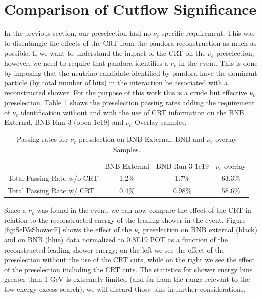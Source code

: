 \newpage
\section{Comparison of Cutflow Significance}\label{sec:Significance}
In the previous section, our preselection had no $\nu_e$ specific requirement. This was to disentangle the  effects of the CRT from the pandora reconstruction as much as possible. If we want to understand the impact of the CRT on the $\nu_e$ preselection, however, we need to require that pandora identifies a $\nu_e$ in the event.  This is done by imposing that the neutrino candidate identified by pandora have the dominant particle (by total number of hits) in the interaction be associated with a reconstructed shower. For the purpose of this work this is a crude but effective $\nu_e$ preselection.
Table \ref{tab:PSNue} shows the preselection passing rates adding the requirement of $\nu_e$ identification without and with the use of CRT information on the BNB External,  BNB Run 3 (open 1e19) and  $\nu_e$ Overlay samples. 


\begin{table}[h]
\begin{tabular}{ c || c | c || c | c || c | c || }
\cline{2-7}
                                            & \multicolumn{2}{c||}{BNB External} & \multicolumn{2}{c||}{BNB Run 3 1e19} & \multicolumn{2}{c||}{$\nu_e$ overlay} \\ \cline{1-7} 
\multicolumn{1}{|l||}{Total Passing Rate w/o CRT}    &         \multicolumn{2}{c||}{ 1.2\%}    &   \multicolumn{2}{c||}{1.7\%}  & \multicolumn{2}{c||}{63.3\%}\\ \hline
\multicolumn{1}{|l||}{Total Passing Rate w/ CRT}       &                 \multicolumn{2}{c||}{0.4\%}      & \multicolumn{2}{c||}{0.98\%}     &  \multicolumn{2}{c||}{58.6\% }   \\ \hline
\end{tabular}
\caption{Passing rates for $\nu_e$ preselection on BNB External, BNB and $\nu_e$ overlay Samples.}
\label{tab:PSNue}
\end{table}


Since a $\nu_e$ was found in the event, we can now compare the effect of the CRT in relation to the reconstructed energy of the leading shower in the event.
Figure \ref{fig:SelVsShowerE} shows the effect of the $\nu_e$ preselection on BNB external (black) and on BNB  (blue) data normalized to 0.8E19 POT as a function of the reconstructed leading shower energy; on the left we see the effect of the preselection without the use of the CRT cuts, while on the right we see the effect of the preselection including the  CRT cuts. The statistics for shower energy bins greater than 1 GeV is extremely limited (and far from the range relevant to the low energy excess search); we will discard those bins in further considerations. 

